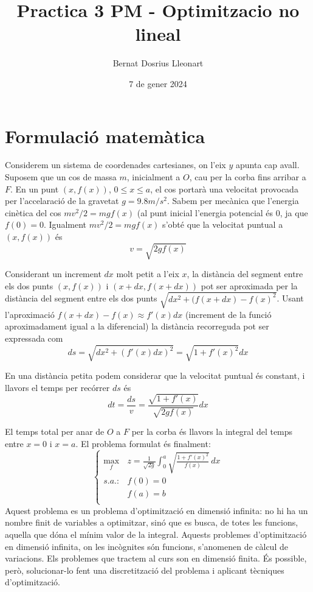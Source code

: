 \documentclass[10pt]{extarticle}
\title{Practica 3 PM - Optimitzacio no lineal}
\author{Bernat Dosrius Lleonart}
\date{7 de gener 2024}
\begin{document}
\maketitle
\section{Formulació matemàtica}
Considerem un sistema de coordenades cartesianes, on l'eix $y$ apunta cap avall. Suposem que un cos de massa $m$, inicialment a $O$, cau per la corba fins arribar a $F$. En un punt $(x,f(x))$, $0 \leq x \leq a$, el cos portarà una velocitat provocada per l'accelaració de la gravetat $g = 9.8m/s^2$. Sabem per mecànica que l'energia cinètica del cos $mv^2/2 = mgf(x)$ (al punt inicial l'energia potencial és 0, ja que $f(0) = 0$. Igualment $mv^2/2 = mgf(x)$ s'obté que la velocitat puntual a $(x,f(x))$ és
$$v = \sqrt{2gf(x)}$$

Considerant un increment $dx$ molt petit a l'eix $x$, la distància del segment entre els dos punts $(x,f(x))$ i $(x+dx,f(x+dx))$ pot ser aproximada per la distància del segment entre els dos punts $\sqrt{dx^2 + (f(x+dx)-f(x)^2}$. Usant l'aproximació $f(x+dx)-f(x)\approx f'(x)dx$ (increment de la funció aproximadament igual a la diferencial) la distància recorreguda pot ser expressada com
$$ds = \sqrt{dx^2 + (f'(x)dx)^2} = \sqrt{1+f'(x)^2}dx$$

En una distància petita podem considerar que la velocitat puntual és constant, i llavors el temps per recórrer $ds$ és
$$dt = \frac{ds}{v} = \frac{\sqrt{1+f'(x)}}{\sqrt{2gf(x)}}dx$$

El temps total per anar de $O$ a $F$ per la corba és llavors la integral del temps entre $x = 0$ i $x = a$. El problema formulat és finalment:
\begin{equation*}
    \left\{
    \begin{array}{ll}
        \displaystyle{\max\limits_{f}} & \displaystyle{z = \frac{1}{\sqrt{2g}} \int_{0}^{a} \sqrt{\frac{1+f'(x)^2}{f(x)}} \,dx} \\
        s.a.: & \displaystyle{f(0)} = 0 \\
        & \displaystyle{f(a)} = b \\
    \end{array}
    \right.
\end{equation*}
Aquest problema es un problema d'optimització en dimensió infinita: no hi ha un nombre finit de variables a optimitzar, sinó que es busca, de totes les funcions, aquella que dóna el mínim valor de la integral. Aquests problemes d'optimització en dimensió infinita, on les incògnites són funcions, s'anomenen de càlcul de variacions. Els problemes que tractem al curs son en dimensió finita. És possible, però, solucionar-lo fent una discretització del problema i aplicant tècniques d'optimització.
\end{document}
